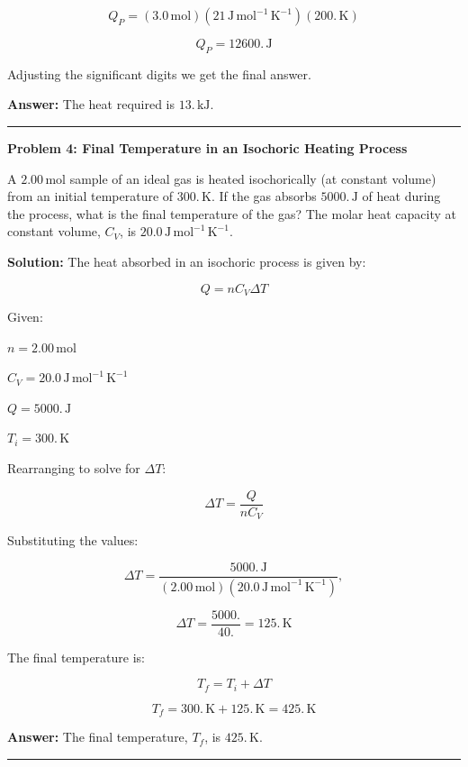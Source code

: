 \documentclass[
  9pt,
]{extbook}
\theoremstyle{definition}
\theoremstyle{definition}
\theoremstyle{definition}
\theoremstyle{definition}
\theoremstyle{remark}
\begin{document}
\[ Q_P = (3.0 \, \text{mol})(21 \, \text{J} \, \text{mol}^{-1} \, \text{K}^{-1})(200. \, \text{K}) \]

\[ Q_P = 12600. \, \text{J} \]

Adjusting the significant digits we get the final answer.

\textbf{Answer:} The heat required is \(13. \, \text{kJ}\).

\begin{center}\rule{0.5\linewidth}{0.5pt}\end{center}

\textbf{Problem 4: Final Temperature in an Isochoric Heating Process}

A \(2.00 \, \text{mol}\) sample of an ideal gas is heated isochorically (at constant volume) from an initial temperature of \(300. \, \text{K}\). If the gas absorbs \(5000. \, \text{J}\) of heat during the process, what is the final temperature of the gas? The molar heat capacity at constant volume, \(C_V\), is \(20.0 \, \text{J} \, \text{mol}^{-1} \, \text{K}^{-1}\).

\textbf{Solution:} The heat absorbed in an isochoric process is given by:

\[ Q = n C_V \Delta T \]

Given:

\(n = 2.00 \, \text{mol}\)

\(C_V = 20.0 \, \text{J} \, \text{mol}^{-1} \, \text{K}^{-1}\)

\(Q = 5000. \, \text{J}\)

\(T_i = 300. \, \text{K}\)

Rearranging to solve for \(\Delta T\):

\[ \Delta T = \frac{Q}{n C_V} \]

Substituting the values:

\[ \Delta T = \frac{5000. \, \text{J}}{(2.00\,\text{mol}) (20.0 \, \text{J} \, \text{mol}^{-1} \, \text{K}^{-1})},\]

\[ \Delta T = \frac{5000.}{40.} = 125. \, \text{K} \]

The final temperature is:

\[ T_f = T_i + \Delta T \]

\[ T_f = 300. \, \text{K} + 125. \, \text{K} = 425. \, \text{K} \]

\textbf{Answer:} The final temperature, \(T_f\), is \(425. \, \text{K}\).

\begin{center}\rule{0.5\linewidth}{0.5pt}\end{center}
\end{document}
